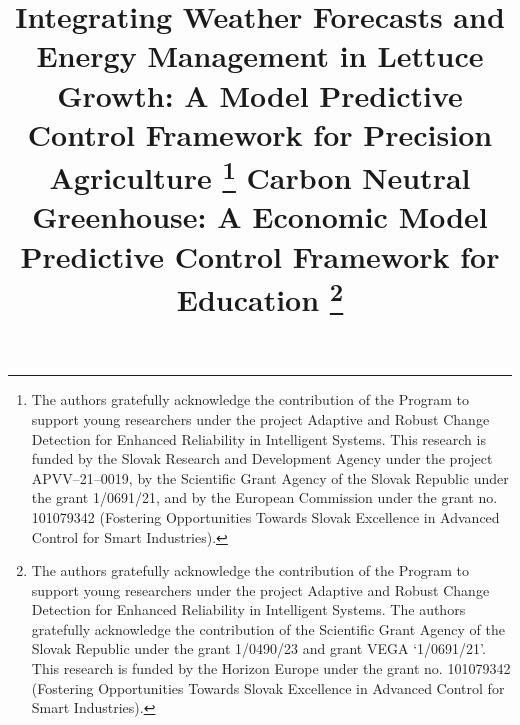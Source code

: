 \documentclass[conference]{IEEEtran}
\begin{document}
\title{Integrating Weather Forecasts and Energy Management in Lettuce Growth: A Model Predictive Control Framework for Precision Agriculture
    \thanks{The authors gratefully acknowledge the contribution of the Program to support young researchers under the project Adaptive and Robust Change Detection for Enhanced Reliability in Intelligent Systems. This research is funded by the Slovak Research and Development Agency under the project APVV--21--0019, by the Scientific Grant Agency of the Slovak Republic under the grant 1/0691/21, and by the European Commission under the grant no. 101079342 (Fostering Opportunities Towards Slovak Excellence in Advanced Control for Smart Industries).}
}

\title{Carbon Neutral Greenhouse: A Economic Model Predictive Control Framework for Education
    \thanks{The authors gratefully acknowledge the contribution of the Program to support young researchers under the project Adaptive and Robust Change Detection for Enhanced Reliability in Intelligent Systems. The authors gratefully acknowledge the contribution of the Scientific Grant Agency of the Slovak Republic under the grant 1/0490/23 and grant VEGA `1/0691/21'. This research is funded by the Horizon Europe under the grant no. 101079342 (Fostering Opportunities Towards Slovak Excellence in Advanced Control for Smart Industries).}
}

\author{
}

\maketitle
\end{document}
